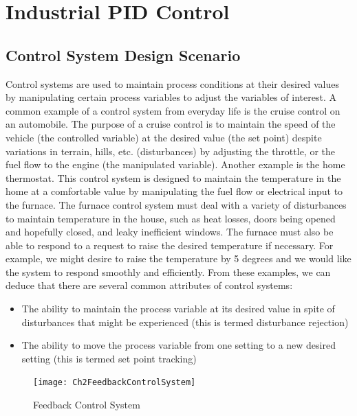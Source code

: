 \chapter{Industrial PID Control}
\label{chap:IndustrialPID}


\section{Control System Design Scenario}
\label{sec:1}

Control systems are used to maintain process conditions at their desired values by manipulating certain process variables to adjust the variables of interest. A common example of a control system from everyday life is the cruise control on an automobile. The purpose of a cruise control is to maintain the speed of the vehicle (the controlled variable) at the desired value (the set point) despite variations in terrain, hills, etc. (disturbances) by adjusting the throttle, or the fuel flow to the engine (the manipulated variable). Another example is the home thermostat. This control system is designed to maintain the temperature in the home at a comfortable value by manipulating the fuel flow or electrical input to the furnace. The furnace control system must deal with a variety of disturbances to maintain temperature in the house, such as heat losses, doors being opened and hopefully closed, and leaky inefficient windows. The furnace must also be able to respond to a request to raise the desired temperature if necessary. For example, we might desire to raise the temperature by 5 degrees and we would like the system to respond smoothly and efficiently. From these examples, we can deduce that there are several common attributes of control systems:
\begin{itemize}
\item The ability to maintain the process variable at its desired value in spite of disturbances that might be experienced (this is termed disturbance rejection)
\item The ability to move the process variable from one setting to a new desired setting (this is termed set point tracking)
\end{itemize}
%
\begin{figure}[tb]
\centering
\texttt{[image: Ch2FeedbackControlSystem]}
\caption{Feedback Control System} \label{Ch2fig:FeedbackControlSystem}
\end{figure}

